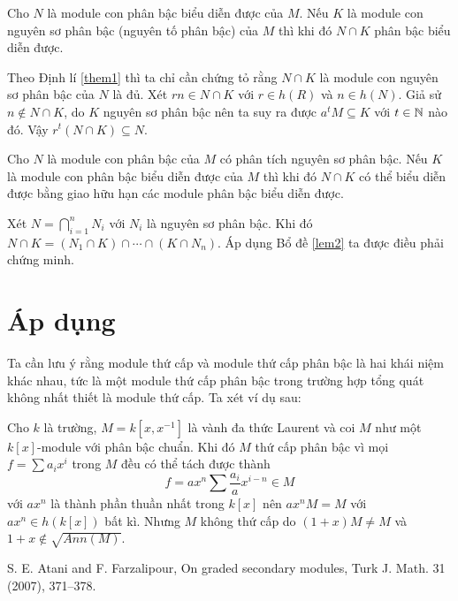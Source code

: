 \begin{lemma}
    \label{lem2}
    Cho $N$ là module con phân bậc biểu diễn được của $M$. Nếu $K$ là module con nguyên sơ phân bậc (nguyên tố phân bậc) của $M$ thì khi đó $N \cap K$ phân bậc biểu diễn được.
\end{lemma}
\startproof Theo Định lí \ref{them1} thì ta chỉ cần chứng tỏ rằng $N \cap K$ là module con nguyên sơ phân bậc của $N$ là đủ. Xét $rn \in N \cap K$ với $r \in h(R)$ và $n \in h(N)$. Giả sử $n \notin N \cap K$, do $K$ nguyên sơ phân bậc nên ta suy ra được $a^tM \subseteq K$ với $t \in \mathbb N$ nào đó. Vậy $r^t(N \cap K) \subseteq N$. \QED

\begin{theorem}
    Cho $N$ là module con phân bậc của $M$ có phân tích nguyên sơ phân bậc. Nếu $K$ là module con phân bậc biểu diễn được của $M$ thì khi đó $N \cap K$ có thể biểu diễn được bằng giao hữu hạn các module phân bậc biểu diễn được.
\end{theorem}
\startproof Xét $N = \bigcap_{i=1}^n N_i$ với $N_i$ là nguyên sơ phân bậc. Khi đó $N \cap K = (N_1 \cap K) \cap \cdots \cap (K \cap N_n)$. Áp dụng Bổ đề \ref{lem2} ta được điều phải chứng minh. \QED

\section{Áp dụng}
Ta cần lưu ý rằng module thứ cấp và module thứ cấp phân bậc là hai khái niệm khác nhau, tức là một module thứ cấp phân bậc trong trường hợp tổng quát không nhất thiết là module thứ cấp. Ta xét ví dụ sau:
\begin{example}
    Cho $k$ là trường, $M = k[x,x^{-1}]$ là vành đa thức Laurent và coi $M$ như một $k[x]$-module với phân bậc chuẩn. Khi đó $M$ thứ cấp phân bậc vì mọi $f = \sum a_ix^i$ trong $M$ đều có thể tách được thành
    $$
        f = ax^n\sum \frac{a_i}{a}x^{i-n} \in M
    $$
    với $ax^n$ là thành phần thuần nhất trong $k[x]$ nên $ax^n M = M$ với $ax^n \in h(k[x])$ bất kì. Nhưng $M$ không thứ cấp do $(1+x)M \neq M$ và $1+x \notin \sqrt{Ann(M)}$.
\end{example}

\renewcommand\refname{Tài liệu tham khảo}
\begin{thebibliography}{9}
     S. E. Atani and F. Farzalipour, On graded secondary modules, Turk J. Math. 31 (2007), 371–378.
\end{thebibliography}

